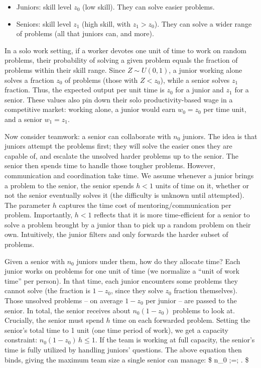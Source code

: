 \documentclass[12pt]{article}
\begin{document}
\begin{itemize}
\tightlist
\item
  {Juniors:} skill level \(z_0\) (low skill). They can solve
  easier problems.
\item
  {Seniors:} skill level \(z_1\) (high skill, with
  \(z_1 > z_0\)). They can solve a wider range of problems (all that
  juniors can, and more).
\end{itemize}

In a {solo work} setting, if a worker devotes one unit of time to
work on random problems, their probability of solving a given problem
equals the fraction of problems within their skill range. Since
\(Z \sim U(0,1)\), a junior working alone solves a fraction \(z_0\) of
problems (those with \(Z < z_0\)), while a senior solves \(z_1\)
fraction. Thus, the {expected output per unit time} is \(z_0\)
for a junior and \(z_1\) for a senior. These values also pin down their
{solo productivity-based wage} in a competitive market: working
alone, a junior would earn \(w_0 = z_0\) per time unit, and a senior
\(w_1 = z_1\).

Now consider {teamwork:} a senior can collaborate with \(n_0\)
juniors. The idea is that juniors attempt the problems first; they will
solve the easier ones they are capable of, and {escalate the
unsolved harder problems up to the senior}. The senior then spends time
to handle those tougher problems. However, communication and
coordination take time. We assume {whenever a junior brings a
problem to the senior, the senior spends \(h < 1\) units of time on it},
whether or not the senior eventually solves it (the difficulty is
unknown until attempted). The parameter \(h\) captures the {time
cost of mentoring/communication per problem}. Importantly, \(h<1\)
reflects that it is more {time-efficient for a senior to solve a
problem brought by a junior} than to pick up a random problem on their
own. Intuitively, the junior filters and only forwards the harder subset
of problems.

Given a senior with \(n_0\) juniors under them, how do they allocate
time? Each junior works on problems for one unit of time (we normalize a
``unit of work time'' per person). In that time, each junior encounters
some problems they cannot solve (the fraction is \(1 - z_0\), since they
solve \(z_0\) fraction themselves). Those unsolved problems -- on
average \(1-z_0\) per junior -- are passed to the senior. In total, the
senior receives about \(n_0 (1 - z_0)\) problems to look at.
{Crucially, the senior must spend \(h\) time on each forwarded
problem.} Setting the senior's total time to 1 unit (one time period of
work), we get a capacity constraint: \(n_0 (1 - z_0)\, h \le 1.\) If the
team is working at full capacity, the senior's time is fully utilized by
handling juniors' questions. The above equation then binds, giving the
{maximum team size} a single senior can manage: \$ n\_0 ;=;
. \$
\end{document}
